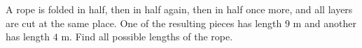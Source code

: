 A rope is folded in half, then in half again, then in half once more, and all layers are cut at the same place. One of the resulting pieces has length $9$ m and another has length $4$ m. Find all possible lengths of the rope.
